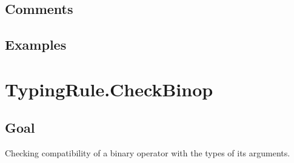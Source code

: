 \documentclass{book}
\begin{document}
\subsection{Comments}

\subsection{Examples}

 \section{TypingRule.CheckBinop}

\subsection{Goal}
  Checking compatibility of a binary operator with the types of its arguments.
\end{document}
